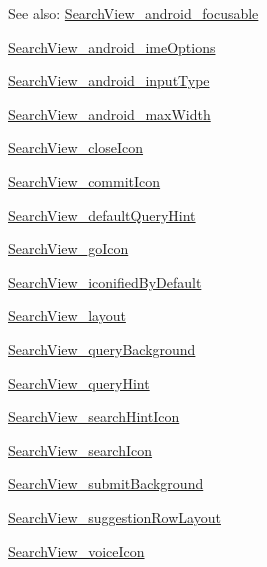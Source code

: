 \begin{Desc}
\item[See also:]\hyperlink{classandroid_1_1support_1_1v4_1_1_r_1_1styleable_e995a1e9fe744b38a1cd3db6e38b9003}{SearchView\_\-android\_\-focusable} 

\hyperlink{classandroid_1_1support_1_1v4_1_1_r_1_1styleable_924ffeb8267d0e19f5948a2ccbf8b1b2}{SearchView\_\-android\_\-imeOptions} 

\hyperlink{classandroid_1_1support_1_1v4_1_1_r_1_1styleable_b8d1739250c6edeea1c7639b77701e8a}{SearchView\_\-android\_\-inputType} 

\hyperlink{classandroid_1_1support_1_1v4_1_1_r_1_1styleable_a7408a4cb904af448f8138e31449f9aa}{SearchView\_\-android\_\-maxWidth} 

\hyperlink{classandroid_1_1support_1_1v4_1_1_r_1_1styleable_604e593d78318f98842bc75b6f058c85}{SearchView\_\-closeIcon} 

\hyperlink{classandroid_1_1support_1_1v4_1_1_r_1_1styleable_7596f400f76fad60028392a5d9d8e462}{SearchView\_\-commitIcon} 

\hyperlink{classandroid_1_1support_1_1v4_1_1_r_1_1styleable_269652287752b5c18c19cdf2cf0aeb52}{SearchView\_\-defaultQueryHint} 

\hyperlink{classandroid_1_1support_1_1v4_1_1_r_1_1styleable_90f7086fb0866e78b77259eb32289c59}{SearchView\_\-goIcon} 

\hyperlink{classandroid_1_1support_1_1v4_1_1_r_1_1styleable_082b54398657d1cdbea56322bf7c5e7f}{SearchView\_\-iconifiedByDefault} 

\hyperlink{classandroid_1_1support_1_1v4_1_1_r_1_1styleable_70f15e7a0ccd231aa82768bfe48b1fec}{SearchView\_\-layout} 

\hyperlink{classandroid_1_1support_1_1v4_1_1_r_1_1styleable_9edc86d9cbb248a65311249ed4ca415c}{SearchView\_\-queryBackground} 

\hyperlink{classandroid_1_1support_1_1v4_1_1_r_1_1styleable_f0192b0ba88140e41e2b0f9db1bb970a}{SearchView\_\-queryHint} 

\hyperlink{classandroid_1_1support_1_1v4_1_1_r_1_1styleable_4067485964152ef1a1eb4f8bf0d25188}{SearchView\_\-searchHintIcon} 

\hyperlink{classandroid_1_1support_1_1v4_1_1_r_1_1styleable_2e407a80c6bca332a7b5c0632369c9dd}{SearchView\_\-searchIcon} 

\hyperlink{classandroid_1_1support_1_1v4_1_1_r_1_1styleable_699aa92aa27e99d69cc974bc01481aea}{SearchView\_\-submitBackground} 

\hyperlink{classandroid_1_1support_1_1v4_1_1_r_1_1styleable_603a0727c95352880049f37bb9b130ed}{SearchView\_\-suggestionRowLayout} 

\hyperlink{classandroid_1_1support_1_1v4_1_1_r_1_1styleable_9e4c859282f5e9607d3b5ed4f4748148}{SearchView\_\-voiceIcon} \end{Desc}
